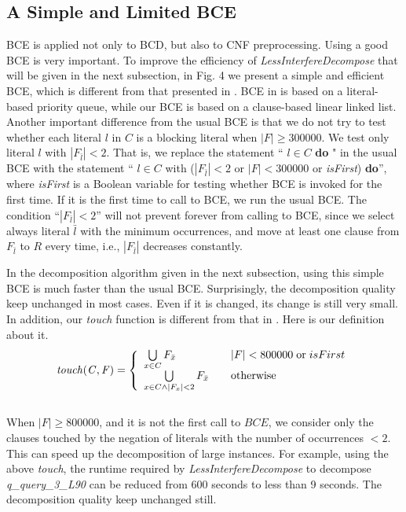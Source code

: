 \documentclass{llncs}
\begin{document}
\subsection{A Simple and Limited BCE}

BCE is applied not only to BCD, but also to CNF preprocessing. Using
a good BCE is very important.  To improve the efficiency of
\emph{LessInterfereDecompose} that will be given in the next
subsection, in Fig. 4 we present a simple and efficient BCE, which
is different from that presented in \cite{BCE:12}. BCE in
\cite{BCE:12} is based on a literal-based priority queue, while our
BCE is based on a clause-based linear linked list. Another important
difference from the usual BCE is that we do not try to test whether
each literal $l$ in $C$ is a blocking literal when $|F|\geq300000$.
We test only literal $l$ with $|F_{\bar l}|<2$. That is, we replace
the statement `` {  $ l \in C $ {\bf do} }" in the
usual BCE with the statement `` { $ l \in C $ with
($|F_{\bar l}|<2$ or $|F|<300000$ or \emph{isFirst}) {\bf do}}'',
where \emph{isFirst} is a Boolean variable for testing whether BCE
is invoked for the first time. If it is the first time to call to
BCE, we run the usual BCE. The condition ``$|F_{\bar l}|<2$'' will
not prevent forever from calling to BCE, since we select always
literal $\bar l$ with the minimum occurrences, and move at least one
clause from $F_{\bar l}$ to $R$ every time, i.e., $|F_{\bar l}|$
decreases constantly.

 In the decomposition algorithm given in the next subsection, using this simple BCE is
much faster than the usual BCE. Surprisingly, the decomposition
quality keep unchanged in most cases. Even if it is changed, its
change is still very small. In addition, our \emph{ touch} function
is different from that in \cite{BCE:12}. Here is our definition
about it.
\[{\it touch(C,F)}= \left \{ \begin {array}
         {l@{\quad \quad}l}
         \bigcup\limits_{x \in C}F_{\bar x} & |F| < 800000 \hskip 1mm \mathrm{or} \hskip 1mm isFirst \\
         \bigcup\limits_{x \in C \wedge |F_x|<2}F_{\bar x} & \mathrm
         {otherwise}
         \end {array} \right . \]\\
When $|F| \geq 800000$, and it is not the first call to $BCE$, we
consider only the clauses touched by the negation of literals with
the number of occurrences $< 2$. This can speed up the decomposition
of large instances. For example, using the above \emph{touch},  the
runtime required by \emph{LessInterfereDecompose} to decompose
\emph{q\_query\_3\_L90} can be reduced from 600 seconds to less than
9 seconds. The decomposition quality keep unchanged still.
\end{document}
